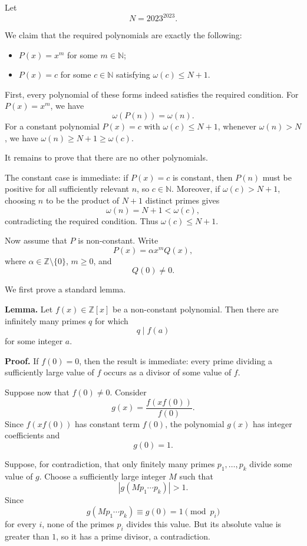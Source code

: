 Let
$$
N=2023^{2023}.
$$

We claim that the required polynomials are exactly the following:

\begin{itemize}
\item $P(x)=x^m$ for some $m\in\mathbb{N}$;
\item $P(x)=c$ for some $c\in\mathbb{N}$ satisfying $\omega(c)\leq N+1$.
\end{itemize}

First, every polynomial of these forms indeed satisfies the required condition. For $P(x)=x^m$, we have
$$
\omega(P(n))=\omega(n).
$$
For a constant polynomial $P(x)=c$ with $\omega(c)\leq N+1$, whenever $\omega(n)>N$, we have $\omega(n)\geq N+1\geq\omega(c)$.

It remains to prove that there are no other polynomials.

The constant case is immediate: if $P(x)=c$ is constant, then $P(n)$ must be positive for all sufficiently relevant $n$, so $c\in\mathbb{N}$. Moreover, if $\omega(c)>N+1$, choosing $n$ to be the product of $N+1$ distinct primes gives
$$
\omega(n)=N+1<\omega(c),
$$
contradicting the required condition. Thus $\omega(c)\leq N+1$.

Now assume that $P$ is non-constant. Write
$$
P(x)=\alpha x^m Q(x),
$$
where $\alpha\in\mathbb{Z}\setminus\{0\}$, $m\geq 0$, and
$$
Q(0)\neq 0.
$$

We first prove a standard lemma.

\textbf{Lemma.}
Let $f(x)\in\mathbb{Z}[x]$ be a non-constant polynomial. Then there are infinitely many primes $q$ for which
$$
q\mid f(a)
$$
for some integer $a$.

\textbf{Proof.}
If $f(0)=0$, then the result is immediate: every prime dividing a sufficiently large value of $f$ occurs as a divisor of some value of $f$.

Suppose now that $f(0)\neq 0$. Consider
$$
g(x)=\frac{f(xf(0))}{f(0)}.
$$
Since $f(xf(0))$ has constant term $f(0)$, the polynomial $g(x)$ has integer coefficients and
$$
g(0)=1.
$$

Suppose, for contradiction, that only finitely many primes $p_1,\ldots,p_k$ divide some value of $g$. Choose a sufficiently large integer $M$ such that
$$
|g(Mp_1\cdots p_k)|>1.
$$
Since
$$
g(Mp_1\cdots p_k)\equiv g(0)=1\pmod{p_i}
$$
for every $i$, none of the primes $p_i$ divides this value. But its absolute value is greater than $1$, so it has a prime divisor, a contradiction.

